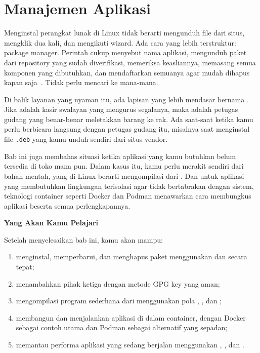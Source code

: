 
\chapter{Manajemen Aplikasi}
\label{ch:application-management}


Menginstal perangkat lunak di Linux tidak berarti mengunduh file dari situs, mengklik
dua kali, dan mengikuti wizard. Ada cara yang lebih terstruktur: package manager.
Perintah  cukup menyebut nama aplikasi, mengunduh paket dari repository yang
sudah diverifikasi, memeriksa keasliannya, memasang semua komponen yang dibutuhkan,
dan mendaftarkan semuanya agar mudah dihapus kapan saja~\cite{ubuntudocs, archlinuxwiki}.
Tidak perlu mencari ke mana-mana.

Di balik layanan  yang nyaman itu, ada lapisan yang lebih mendasar bernama
. Jika  adalah kasir swalayan yang mengurus segalanya, maka
 adalah petugas gudang yang benar-benar meletakkan barang ke rak. Ada
saat-saat ketika kamu perlu berbicara langsung dengan petugas gudang itu, misalnya
saat menginstal file \texttt{.deb} yang kamu unduh sendiri dari situs vendor.

Bab ini juga membahas situasi ketika aplikasi yang kamu butuhkan belum tersedia
di toko mana pun. Dalam kasus itu, kamu perlu merakit sendiri dari bahan mentah,
yang di Linux berarti mengompilasi dari . Dan untuk aplikasi
 yang membutuhkan lingkungan terisolasi agar tidak bertabrakan dengan sistem,
 teknologi container seperti Docker dan Podman menawarkan cara membungkus
 aplikasi beserta semua perlengkapannya.

\textbf{Yang Akan Kamu Pelajari}

Setelah menyelesaikan bab ini, kamu akan mampu:

\begin{enumerate}
    \item menginstal, memperbarui, dan menghapus paket menggunakan  dan
         secara tepat;
    \item menambahkan  pihak ketiga dengan metode GPG key yang aman;
    \item mengompilasi program sederhana dari  menggunakan pola
        , , dan ;
    \item membangun dan menjalankan aplikasi di dalam container, dengan Docker
        sebagai contoh utama dan Podman sebagai alternatif yang sepadan;
    \item memantau performa aplikasi yang sedang berjalan menggunakan ,
        , dan .
\end{enumerate}

